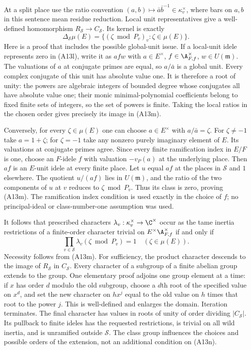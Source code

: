 At a split place use the ratio convention
$(a,b)\mapsto\bar a\bar b^{-1}\in\kappa_v^\times$,
where bars on $a,b$ in this sentence mean residue reduction.
Local unit representatives give a well-defined homomorphism
$R_{\mathcal S}\to C_{\mathcal S}$.  Its kernel is exactly
\[
 \Delta_{\mathcal S}\mu(E)
    =\{(\zeta\bmod P_v)_v:\zeta\in\mu(E)\}.
 \tag{A13m}
\]
Here is a proof that includes the possible global-unit issue.
If a local-unit idele represents zero in (A13l), write it
as $a f w$ with $a\in E^\times$, $f\in\A_{F,f}^\times$,
$w\in U(\mathfrak m)$.  The valuations of $a$ at conjugate
primes are equal, so $a/\bar a$ is a global unit.  Every
complex conjugate of this unit has absolute value one.
It is therefore a root of unity: the powers are algebraic
integers of bounded degree whose conjugates all have
absolute value one; their monic minimal-polynomial
coefficients belong to fixed finite sets of integers,
so the set of powers is finite.  Taking the local ratios
in the chosen order gives precisely its image in (A13m).

Conversely, for every $\zeta\in\mu(E)$ one can choose
$a\in E^\times$ with $a/\bar a=\zeta$.
For $\zeta\ne-1$ take $a=1+\zeta$; for $\zeta=-1$
take any nonzero purely imaginary element of $E$.
Its valuations at conjugate primes agree.  Since every
finite ramification index in $E/F$ is one, choose an
$F$-idele $f$ with valuation $-v_P(a)$ at the underlying
place.  Then $af$ is an $E$-unit idele at every finite
place.  Let $u$ equal $af$ at the places in $\mathcal S$
and $1$ elsewhere.  The quotient $u/(af)$ lies in
$U(\mathfrak m)$, and the ratio of the two components
of $u$ at $v$ reduces to $\zeta\bmod P_v$.
Thus its class is zero, proving (A13m).  The ramification
index condition is used exactly in the choice of $f$;
no principal-ideal or class-number-one assumption was used.

It follows that prescribed characters
$\lambda_v:\kappa_v^\times\to\C^\times$ occur as the tame
inertia restrictions of a finite-order character trivial
on $E^\times\A_{F,f}^\times$ if and only if
\[
              \prod_{v\in\mathcal S}
                   \lambda_v(\zeta\bmod P_v)=1
                         \quad(\zeta\in\mu(E)).
 \tag{A13n}
\]
Necessity follows from (A13m).  For sufficiency, the
product character descends to the image of $R_{\mathcal S}$
in $C_{\mathcal S}$.  Every character of a subgroup of
a finite abelian group extends to the group.  One elementary
proof adjoins one group element at a time: if $x$ has order
$d$ modulo the old subgroup, choose a $d$th root of the
specified value on $x^d$, and set the new character on
$hx^j$ equal to the old value on $h$ times that root to
the power $j$.  This is well-defined and enlarges the
domain.  Iteration terminates.  The final character has
values in roots of unity of order dividing
$|C_{\mathcal S}|$.  Its pullback to finite ideles has
the requested restrictions, is trivial on all wild inertia,
and is unramified outside $\mathcal S$.
The class group influences the choices and possible orders
of the extension, not an additional condition on (A13n).

